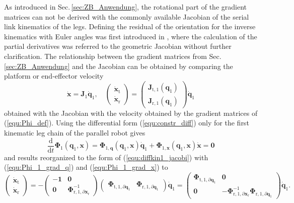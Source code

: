 \documentclass[robotics,article,submit,moreauthors,pdftex]{Definitions/mdpi}
\newcommand{\bm}[1]{\boldsymbol{#1}}
\begin{document}
As introduced in Sec.\,\ref{sec:ZB_Anwendung}, the rotational part of the gradient matrices can not be derived with the commonly available Jacobian of the serial link kinematics of the legs.
Defining the residual of the orientation for the inverse kinematics with Euler angles was first introduced in \cite{GoldenbergBenFen1985}, where the calculation of the partial derivatives was referred to the geometric Jacobian without further clarification.
The relationship between the gradient matrices from Sec.\,\ref{sec:ZB_Anwendung} and the Jacobian can be obtained by comparing the platform or end-effector velocity 
%
\begin{equation}
\dot{\bm{x}} = \bm{J}_1 \dot{\bm{q}}_1,
\quad
\begin{pmatrix}
\dot{\bm{x}}_\mathrm{t}\\
\dot{\bm{x}}_\mathrm{r}
\end{pmatrix}
 = 
\begin{pmatrix}
 \bm{J}_{\mathrm{t},1}(\bm{q}_1)\\
 \bm{J}_{\mathrm{r},1}(\bm{q}_1) 
\end{pmatrix}
\dot{\bm{q}}_1
\label{equ:diffkin1_jacobi}
\end{equation}
%
obtained with the Jacobian with the velocity obtained by the gradient matrices of (\ref{equ:Phi_def}).
Using the differential form (\ref{equ:constr_diff}) only for the first kinematic leg chain of the parallel robot gives
%
\begin{equation}
\frac{\mathrm{d}}{\mathrm{d}t} \bm{\Phi}_1(\bm{q}_1,\bm{x})
=
\bm{\Phi}_{1,\bm{q}}(\bm{q}_1,\bm{x}) \dot{\bm{q}}_1 + \bm{\Phi}_{1,\bm{x}}(\bm{q}_1,\bm{x}) \dot{\bm{x}} 
=
\bm{0}
\label{equ:constr_diff1}
\end{equation}
%
and results reorganized to the form of (\ref{equ:diffkin1_jacobi}) with (\ref{equ:Phi_1_grad_q}) and (\ref{equ:Phi_1_grad_x}) to
%
\begin{equation}
\begin{pmatrix}
\dot{\bm{x}}_\mathrm{t}\\
\dot{\bm{x}}_\mathrm{r}
\end{pmatrix}
=
-
\begin{pmatrix}
-\bm{1} & \bm{0} \\
\bm{0} & \bm{\Phi}_{\mathrm{r},1,\partial\bm{x}_\mathrm{r}}^{-1}
\end{pmatrix}
\begin{pmatrix}
\bm{\Phi}_{\mathrm{t},1,\partial\bm{q}_1}
&
\bm{\Phi}_{\mathrm{r},1,\partial\bm{q}_1}
\end{pmatrix}
\dot{\bm{q}}_1
=
\begin{pmatrix}
\bm{\Phi}_{\mathrm{t},1,\partial\bm{q}_1} & \bm{0} \\
\bm{0} & -\bm{\Phi}_{\mathrm{r},1,\partial\bm{x}_\mathrm{r}}^{-1} \bm{\Phi}_{\mathrm{r},1,\partial\bm{q}_1}
\end{pmatrix}
\dot{\bm{q}}_1.
\label{equ:diffkin1_gradmat}
\end{equation}
\end{document}
